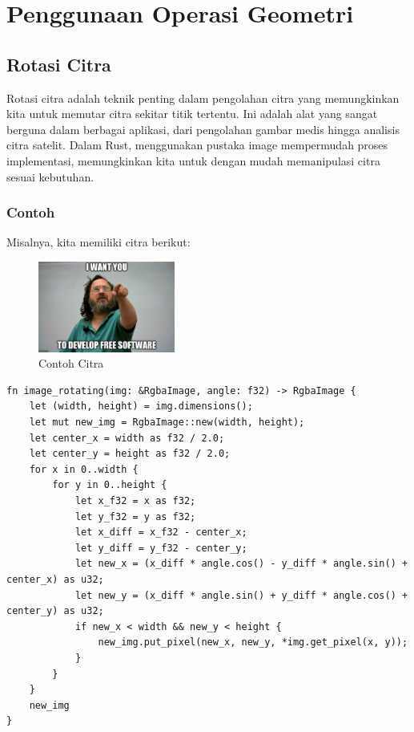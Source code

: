 \documentclass[a4paper,12pt,openany]{book}
\begin{document}
\section{Penggunaan Operasi Geometri}
\subsection{Rotasi Citra}
Rotasi citra adalah teknik penting dalam pengolahan citra yang memungkinkan kita untuk memutar citra sekitar titik tertentu. Ini adalah alat yang sangat berguna dalam berbagai aplikasi, dari pengolahan gambar medis hingga analisis citra satelit. Dalam Rust, menggunakan pustaka image mempermudah proses implementasi, memungkinkan kita untuk dengan mudah memanipulasi citra sesuai kebutuhan.

\subsubsection{Contoh}
Misalnya, kita memiliki citra berikut:
\begin{figure}[H]
    \centering
    \includegraphics[width=0.4\textwidth]{./image/geometry/stallman-meme.jpg}
    \caption{Contoh Citra}
\end{figure}

\begin{lstlisting}
fn image_rotating(img: &RgbaImage, angle: f32) -> RgbaImage {
    let (width, height) = img.dimensions();
    let mut new_img = RgbaImage::new(width, height);
    let center_x = width as f32 / 2.0;
    let center_y = height as f32 / 2.0;
    for x in 0..width {
        for y in 0..height {
            let x_f32 = x as f32;
            let y_f32 = y as f32;
            let x_diff = x_f32 - center_x;
            let y_diff = y_f32 - center_y;
            let new_x = (x_diff * angle.cos() - y_diff * angle.sin() + center_x) as u32;
            let new_y = (x_diff * angle.sin() + y_diff * angle.cos() + center_y) as u32;
            if new_x < width && new_y < height {
                new_img.put_pixel(new_x, new_y, *img.get_pixel(x, y));
            }
        }
    }
    new_img
}
\end{lstlisting}
\end{document}

